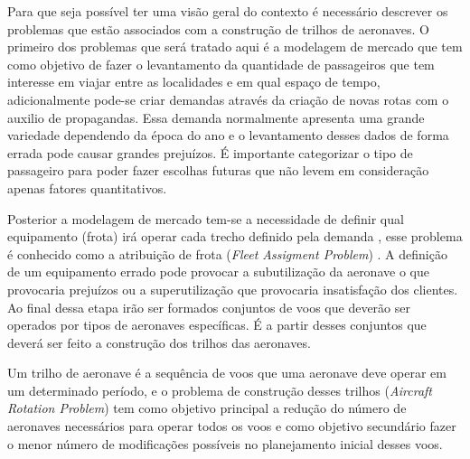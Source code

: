 Para que seja possível ter uma visão geral do contexto é necessário descrever os
problemas que estão associados com a construção de trilhos de aeronaves. O
primeiro dos problemas que será tratado aqui é a modelagem de mercado que tem
como objetivo de fazer o levantamento da quantidade de passageiros que tem
interesse em viajar entre as localidades e em qual espaço de tempo,
adicionalmente pode-se criar demandas através da criação de novas rotas com o
auxilio de propagandas. Essa demanda normalmente apresenta uma grande variedade
dependendo da época do ano e o levantamento desses dados de forma errada pode
causar grandes prejuízos. É importante categorizar o tipo de passageiro para
poder fazer escolhas futuras que não levem em consideração apenas fatores
quantitativos.

Posterior a modelagem de mercado tem-se a necessidade de definir qual
equipamento (frota) irá operar cada trecho definido pela
demanda \cite{pimentel2005}, esse problema é conhecido como a atribuição de
frota (\textit{Fleet Assigment Problem}) . A definição de um equipamento errado
pode provocar a subutilização da aeronave o que provocaria prejuízos ou a
superutilização que provocaria insatisfação dos clientes. Ao final dessa etapa
irão ser formados conjuntos de voos que deverão ser operados por tipos de
aeronaves específicas. É a partir desses conjuntos que deverá ser feito a
construção dos trilhos das aeronaves.

Um trilho de aeronave é a sequência de voos que uma aeronave deve operar em um
determinado período, e o problema de construção desses trilhos 
(\textit{Aircraft Rotation Problem}) tem como objetivo principal a redução do
número de aeronaves necessários para operar todos os voos e como objetivo
secundário fazer o menor número de modificações possíveis no planejamento inicial desses
voos.

